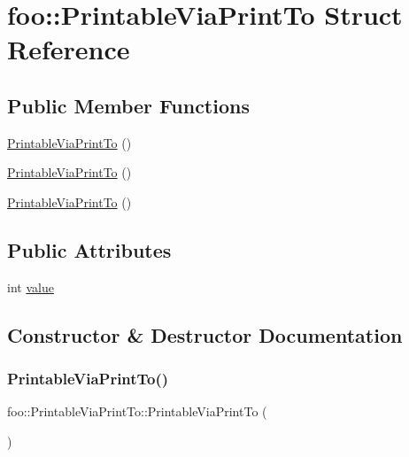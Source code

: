 \hypertarget{structfoo_1_1_printable_via_print_to}{}\section{foo\+::Printable\+Via\+Print\+To Struct Reference}
\label{structfoo_1_1_printable_via_print_to}
\subsection*{Public Member Functions}
\begin{DoxyCompactItemize}
\item 
\mbox{\hyperlink{structfoo_1_1_printable_via_print_to_aa0b30386f09ac39f88e3b54a9397ea01}{Printable\+Via\+Print\+To}} ()
\item 
\mbox{\hyperlink{structfoo_1_1_printable_via_print_to_aa0b30386f09ac39f88e3b54a9397ea01}{Printable\+Via\+Print\+To}} ()
\item 
\mbox{\hyperlink{structfoo_1_1_printable_via_print_to_aa0b30386f09ac39f88e3b54a9397ea01}{Printable\+Via\+Print\+To}} ()
\end{DoxyCompactItemize}
\subsection*{Public Attributes}
\begin{DoxyCompactItemize}
\item 
int \mbox{\hyperlink{structfoo_1_1_printable_via_print_to_a16f8c6420275d86f0d0112ca5a41bca2}{value}}
\end{DoxyCompactItemize}


\subsection{Constructor \& Destructor Documentation}
\mbox{\label{structfoo_1_1_printable_via_print_to_aa0b30386f09ac39f88e3b54a9397ea01}} 
\subsubsection{\texorpdfstring{PrintableViaPrintTo()}{PrintableViaPrintTo()}\hspace{0.1cm}{\footnotesize\ttfamily [1/3]}}
{\footnotesize\ttfamily foo\+::\+Printable\+Via\+Print\+To\+::\+Printable\+Via\+Print\+To (\begin{DoxyParamCaption}{ }\end{DoxyParamCaption})\hspace{0.3cm}{\ttfamily [inline]}}

